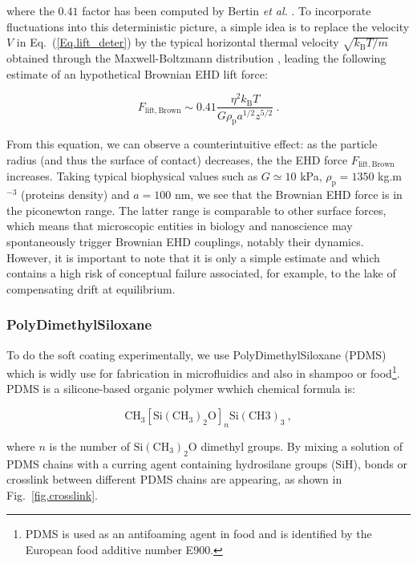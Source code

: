  where the $0.41$ factor has been computed by Bertin \textit{et al.} \cite{bertin_soft-lubrication_2021}. To incorporate fluctuations into this deterministic picture, a simple idea is to replace the velocity $V$ in Eq.~(\ref{Eq.lift_deter}) by the typical horizontal thermal velocity $\sqrt{k_\mathrm{B}T / m}$ obtained through the Maxwell-Boltzmann distribution , leading the following estimate of an hypothetical Brownian \gls{EHD} lift force:

\begin{equation}
	F_\mathrm{lift, Brown} \sim 0.41\frac{\eta ^2 k_\mathrm{B}T}{G\rho_\mathrm{p} a^{1/2} z^{5/2}} ~.
	\label{Eq.lift_brown}
\end{equation}


From this equation, we can observe a counterintuitive effect: as the particle radius (and thus the surface of contact) decreases, the the \gls{EHD} force $F_\mathrm{lift, Brown}$ increases. Taking typical biophysical values such as $G \simeq 10$ kPa, $\rho_\mathrm{p} = 1350$ kg.m$^{-3}$ (proteins density) and $a=100$ nm, we see that the Brownian \gls{EHD} force is in the piconewton range. The latter range is comparable to other surface forces, which means that microscopic entities in biology and nanoscience may spontaneously trigger Brownian \gls{EHD} couplings, notably their dynamics. However, it is important to note that it is only a simple estimate and which contains a high risk of conceptual failure associated, for example, to the lake of compensating drift at equilibrium. 

\subsubsection{PolyDimethylSiloxane}
To do the soft coating experimentally, we use PolyDimethylSiloxane (\gls{PDMS}) which is widly use for fabrication in microfluidics and also in shampoo \cite{im_shampoo_2012} or food\footnote{ \gls{PDMS} is used as an antifoaming agent in food and is identified by the European food additive number E900.}. \gls{PDMS} is a silicone-based organic polymer wwhich chemical formula is:

\begin{equation}
	\mathrm{CH_3[Si(CH_3)_2 O]}_n \mathrm{Si(CH3)_3} ~,
\end{equation}

where $n$ is the number of $\mathrm{Si(CH_3)_2 O}$ dimethyl groups. By mixing a solution of \gls{PDMS} chains with a curring agent containing hydrosilane groups ($\mathrm{SiH}$), bonds or crosslink between different \gls{PDMS} chains are appearing, as shown in Fig.~\ref{fig.crosslink}.




